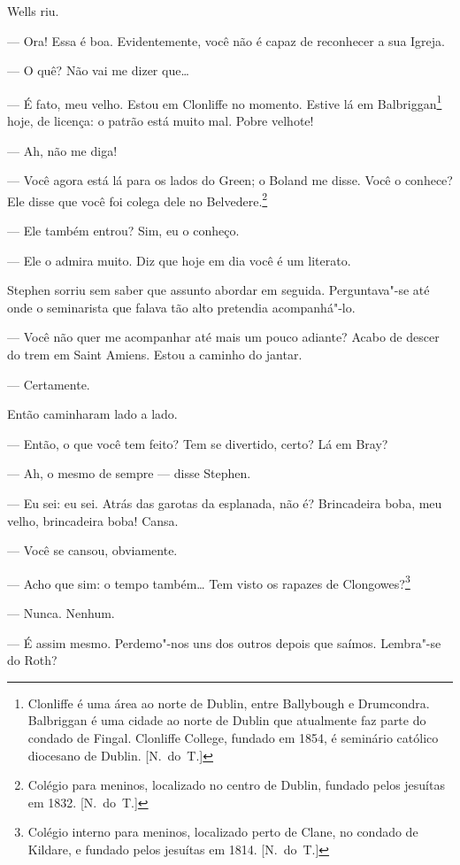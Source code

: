 Wells riu.

--- Ora!  Essa é boa.  Evidentemente, \label{voce"-nao"-e} você não é capaz de
reconhecer a sua Igreja.

--- O quê?  Não vai me dizer que\ldots{}

--- É fato, meu velho.  Estou em Clonliffe no momento.  Estive lá em
Balbriggan\footnote{ Clonliffe é uma área ao norte de Dublin, entre Ballybough
e Drumcondra.  Balbriggan é uma cidade ao norte de Dublin que atualmente faz
parte do condado de Fingal. Clonliffe College, fundado em 1854, é
seminário católico diocesano de Dublin. [N.~do~T.]} hoje, de licença: o patrão
está muito mal.  Pobre velhote!

--- Ah, não me diga!

--- Você agora está lá para os lados do Green; o Boland me disse.
Você o conhece?  Ele disse que você foi colega dele no
Belvedere.\footnote{ Colégio para meninos, localizado no centro de
Dublin, fundado pelos jesuítas em 1832. [N.~do~T.]}

--- Ele também entrou?  Sim, eu o conheço.

--- Ele o admira muito.  Diz que hoje em dia você é um literato.

Stephen sorriu sem saber que assunto abordar em seguida.
Perguntava"-se até onde o seminarista que falava tão alto pretendia
acompanhá"-lo.

--- Você não quer me acompanhar até mais um pouco adiante?  Acabo
de descer do trem em Saint Amiens.  Estou a caminho do jantar.

--- Certamente.

Então caminharam lado a lado.

--- Então, o que você tem feito?  Tem se divertido, certo?  Lá
em Bray?

--- Ah, o mesmo de sempre --- disse Stephen.

--- Eu sei: eu sei.  Atrás das garotas da esplanada, não é?
Brincadeira boba, meu velho, brincadeira boba!  Cansa.

--- Você se cansou, obviamente.

--- Acho que sim: o tempo também\ldots{}  Tem visto os rapazes de
Clongowes?\footnote[\setcounter{symbol}{1}]{ Colégio interno para meninos, localizado perto de
Clane, no condado de Kildare, e fundado pelos jesuítas em 1814. [N.~do~T.]}		

--- Nunca.  Nenhum.

--- É assim mesmo.  Perdemo"-nos uns dos outros depois que saímos.
Lembra"-se do Roth?

